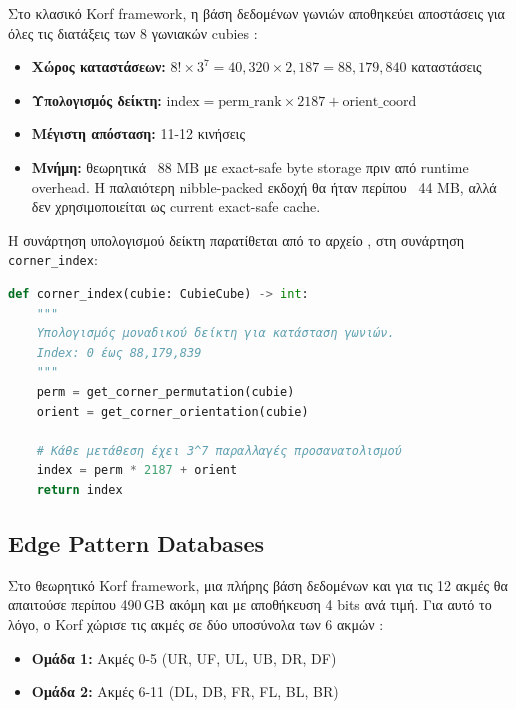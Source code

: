 Στο κλασικό Korf framework, η βάση δεδομένων γωνιών αποθηκεύει αποστάσεις για όλες τις διατάξεις των 8 γωνιακών cubies \cite{korf1997finding}:

\begin{itemize}
    \item \textbf{Χώρος καταστάσεων:} $8! \times 3^7 = 40,320 \times 2,187 = 88,179,840$ καταστάσεις
    \item \textbf{Υπολογισμός δείκτη:} $\text{index} = \text{perm\_rank} \times 2187 + \text{orient\_coord}$
    \item \textbf{Μέγιστη απόσταση:} 11-12 κινήσεις
    \item \textbf{Μνήμη:} θεωρητικά ~88 MB με exact-safe byte storage πριν από runtime overhead. Η παλαιότερη nibble-packed εκδοχή θα ήταν περίπου ~44 MB, αλλά δεν χρησιμοποιείται ως current exact-safe cache.
\end{itemize}

Η συνάρτηση υπολογισμού δείκτη παρατίθεται από το αρχείο
, στη συνάρτηση \texttt{corner\_index}:

\begin{lstlisting}[language=Python, caption={Υπολογισμός δείκτη γωνίας}]
def corner_index(cubie: CubieCube) -> int:
    """
    Υπολογισμός μοναδικού δείκτη για κατάσταση γωνιών.
    Index: 0 έως 88,179,839
    """
    perm = get_corner_permutation(cubie)
    orient = get_corner_orientation(cubie)

    # Κάθε μετάθεση έχει 3^7 παραλλαγές προσανατολισμού
    index = perm * 2187 + orient
    return index
\end{lstlisting}

\subsection{Edge Pattern Databases}

Στο θεωρητικό Korf framework, μια πλήρης βάση δεδομένων και για τις 12 ακμές
θα απαιτούσε περίπου 490\,GB ακόμη και με αποθήκευση 4 bits ανά τιμή. Για
αυτό το λόγο, ο Korf χώρισε τις ακμές σε δύο υποσύνολα των 6 ακμών
\cite{korf1997finding}:

\begin{itemize}
    \item \textbf{Ομάδα 1:} Ακμές 0-5 (UR, UF, UL, UB, DR, DF)
    \item \textbf{Ομάδα 2:} Ακμές 6-11 (DL, DB, FR, FL, BL, BR)
\end{itemize}

